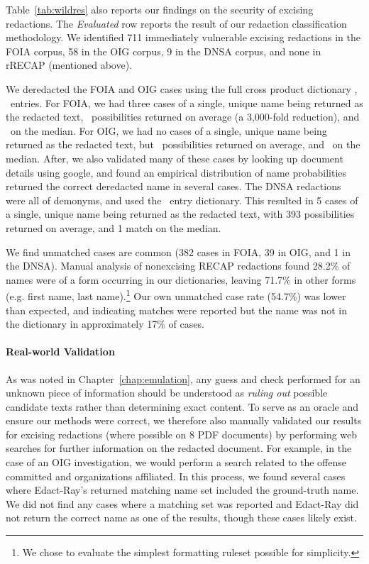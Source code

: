 Table~\ref{tab:wildres} also reports our findings on the security of excising redactions.
The \emph{Evaluated} row reports the result of our redaction classification methodology.
We identified 711 immediately vulnerable excising redactions in the FOIA corpus, 58 in the OIG corpus, 9 in the DNSA corpus, and none in rRECAP (mentioned above).

We deredacted the FOIA and OIG cases using the full cross product dictionary \emph{\fnxlnname}, \neltfnln\ entries.
For FOIA, we had three cases of a single, unique name being returned as the redacted text, \numFOIAavg\ possibilities returned on average (a 3,000-fold reduction), and \numFOIAmed\ on the median.
For OIG, we had no cases of a single, unique name being returned as the redacted text, but \numOIGavg\ possibilities returned on average, and \numOIGmed\ on the median.
After, we also validated many of these cases by looking up document details using google, and found an empirical distribution of name probabilities returned the correct deredacted name in several cases.
The DNSA redactions were all of demonyms, and used the \neltnatl\ entry dictionary.
This resulted in 5 cases of a single, unique name being returned as the redacted text, with 393 possibilities returned on average, and 1 match on the median.

We find unmatched cases are common (382 cases in FOIA, 39 in OIG, and 1 in the DNSA).
Manual analysis of nonexcising RECAP redactions found 28.2\% of names were of a form occurring in our dictionaries, leaving 71.7\% in other forms (e.g. first name, last name).\footnote{We chose to evaluate the simplest formatting ruleset possible for simplicity.}
Our own unmatched case rate (54.7\%) was lower than expected, and indicating matches were reported but the name was not in the dictionary in approximately 17\% of cases.

\paragraph{Real-world Validation}
As was noted in Chapter~\ref{chap:emulation}, any guess and check performed for an unknown piece of information should be understood as \emph{ruling out} possible candidate texts rather than determining exact content.
To serve as an oracle and ensure our methods were correct, we therefore also manually validated our results for excising redactions (where possible on 8 PDF documents) by performing web searches for further information on the redacted document.
For example, in the case of an OIG investigation, we would perform a search related to the offense committed and organizations affiliated.
In this process, we found several cases where Edact-Ray's returned matching name set included the ground-truth name.
We did not find any cases where a matching set was reported and Edact-Ray did not return the correct name as one of the results, though these cases likely exist.

